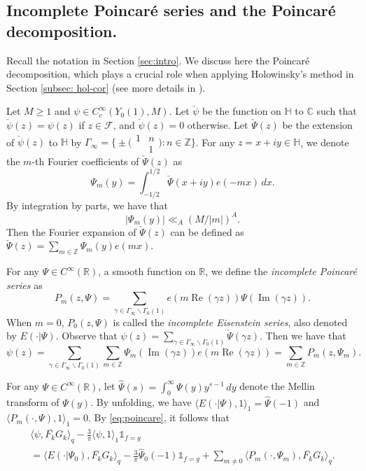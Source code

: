 \documentclass[12pt,reqno]{amsart}
\theoremstyle{remark}
\newcommand{\z}{\mathbb{Z}}
\newcommand{\h}{\mathbb{H}}
\newcommand{\bs}{\backslash}
\DeclareMathOperator{\Real}{Re}
\DeclareMathOperator{\Imag}{Im}
\numberwithin{equation}{section}
\begin{document}
 
	\subsection{Incomplete Poincar\'e series and the Poincar\'e decomposition.}\label{subsec:poincare}
    Recall the notation in Section \ref{sec:intro}. We discuss here the Poincar\'e decomposition, which plays a crucial role when applying Holowinsky's method in Section \ref{subsec: hol-cor} (see more details in \cite[Section 4]{H}).
    
    Let $M \ge 1$ and $\psi \in C^{\infty}_c(Y_0(1), M)$.  Let $\check{\psi}$ be the function on $\h$ to $\mathbb{C}$ such that $\check{\psi}(z) = \psi(z)$ if $z \in \mathcal{F}$, and $\check{\psi}(z) = 0$ otherwise.
    Let $\check{\Psi}(z)$ be the extension of $\check{\psi}(z)$ to $\h$ by $\Gamma_{\infty} = \big\{\pm \big(\begin{smallmatrix} 1 & n\\ & 1 \end{smallmatrix}\big): n \in \z \big\}$. 
   For any $z = x+iy \in \mathbb{H}$,  we denote the $m$-th Fourier coefficients of $\check{\Psi}(z)$ as 
    \[
	\Psi_m(y) = \int_{-1/2}^{1/2} \check{\Psi}(x+iy)e(-mx)\,dx. 
    \]
    By integration by parts, we have that 
	\begin{equation}\label{eq:Psi}
		|\Psi_m(y)| \ll_A (M/|m|)^A.
	\end{equation}
    Then the Fourier expansion of $\check{\Psi}(z)$ can be defined as
    $\check{\Psi}(z) = \sum_{m \in \mathbb{Z}} \Psi_m(y)e(mx).$
    
    For any $\Psi \in C^{\infty}(\mathbb{R})$, a smooth function on $\mathbb{R}$, we define the \textit{incomplete Poincar\'e series} as
	\begin{equation*}
		P_m(z,\Psi) = \sum_{\gamma \in \Gamma_\infty \bs\Gamma_0(1)} e(m\Real(\gamma z))\Psi(\Imag(\gamma z)).
	\end{equation*} 
    When $m=0$, $P_0(z,\Psi)$ is called the \textit{incomplete Eisenstein series}, also denoted by $E(\cdot|\Psi)$. Observe that $\psi(z)=\sum_{ \gamma \in \Gamma_{\infty} \bs\Gamma_0(1)} \check{\Psi}(\gamma z)$. Then we have that
	\begin{equation}\label{eq:poincare}
		\psi(z) = \sum_{ \gamma \in \Gamma_{\infty} \bs\Gamma_0(1)}\sum_{m \in \mathbb{Z}} \Psi_m( \Imag(\gamma z))e(m\Real(\gamma z)) = \sum_{m\in \z}P_m(z, \Psi_m).
	\end{equation}
 
    For any $\Psi \in C^{\infty}(\mathbb{R})$, let $\widehat{\Psi}(s)=\int_0^{\infty}\Psi(y)y^{s-1}\,dy$ 
    denote the Mellin transform of $\Psi(y)$.  
    By unfolding, we have  $\langle E(\cdot|\Psi), 1 \rangle_1 = \widehat{\Psi}(-1)$ and $\langle P_m(\cdot, \Psi), 1 \rangle_1 = 0$. By \eqref{eq:poincare}, it follows that
\begin{multline}\label{eq:poincare2}
        \langle \psi, \overline{F_k}G_k \rangle_q -  \frac{3}{\pi}\langle \psi , 1 \rangle_1 \mathds{1}_{f = g}
        \\ =\langle E(\cdot|\Psi_0), \overline{F_k}G_k \rangle_q - \frac{3}{\pi}\widehat{\Psi}_0(-1)\mathds{1}_{f = g} +\sum_{m \neq 0} \langle P_m(\cdot, \Psi_m), \overline{F_k}G_k \rangle_q.
	\end{multline}
\end{document}

